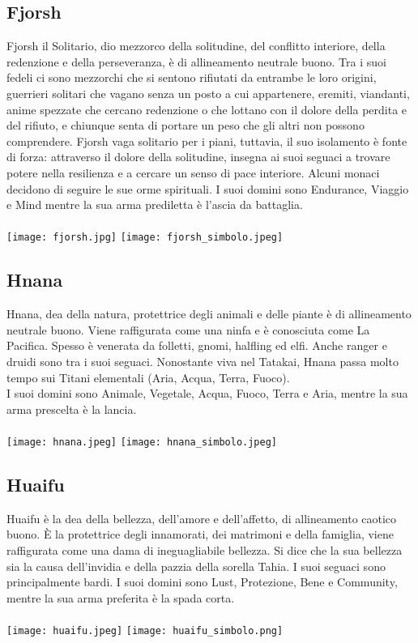 \documentclass[a4paper]{report}
\begin{document}
\begin{multicols}{2}
\subsection*{Fjorsh}
Fjorsh il Solitario, dio mezzorco della solitudine, del conflitto interiore, della redenzione e della perseveranza, è di allineamento neutrale buono. Tra i suoi fedeli ci sono mezzorchi che si sentono rifiutati da entrambe le loro origini, guerrieri solitari che vagano senza un posto a cui appartenere, eremiti, viandanti, anime spezzate che cercano redenzione o che lottano con il dolore della perdita e del rifiuto, e chiunque senta di portare un peso che gli altri non possono comprendere. Fjorsh vaga solitario per i piani, tuttavia, il suo isolamento è fonte di forza: attraverso il dolore della solitudine, insegna ai suoi seguaci a trovare potere nella resilienza e a cercare un senso di pace interiore. Alcuni monaci decidono di seguire le sue orme spirituali. I suoi domini sono Endurance, Viaggio e Mind mentre la sua arma prediletta è l'ascia da battaglia.\\
\\
\texttt{[image: fjorsh.jpg]}
\texttt{[image: fjorsh\_simbolo.jpeg]}\\
\subsection*{Hnana}
Hnana, dea della natura, protettrice degli animali e delle piante è di allineamento neutrale buono. Viene raffigurata come una ninfa e è conosciuta come La Pacifica. Spesso è venerata da folletti, gnomi, halfling ed elfi. Anche ranger e druidi sono tra i suoi seguaci. Nonostante viva nel Tatakai, Hnana passa molto tempo sui Titani elementali (Aria, Acqua, Terra, Fuoco). \\
I suoi domini sono Animale, Vegetale, Acqua, Fuoco, Terra e Aria, mentre la sua arma prescelta è la lancia.\\
\\
\texttt{[image: hnana.jpeg]}
\texttt{[image: hnana\_simbolo.jpeg]}\\
\subsection*{Huaifu}
Huaifu è la dea della bellezza, dell'amore e dell'affetto, di allineamento caotico buono. È la protettrice degli innamorati, dei matrimoni e della famiglia, viene raffigurata come una dama di ineguagliabile bellezza. Si dice che la sua bellezza sia la causa dell'invidia e della pazzia della sorella Tahia. I suoi seguaci sono principalmente bardi. I suoi domini sono Lust, Protezione, Bene e Community, mentre la sua arma preferita è la spada corta.\\
\\
\texttt{[image: huaifu.jpeg]}
\texttt{[image: huaifu\_simbolo.png]}

\end{multicols}
\end{document}
